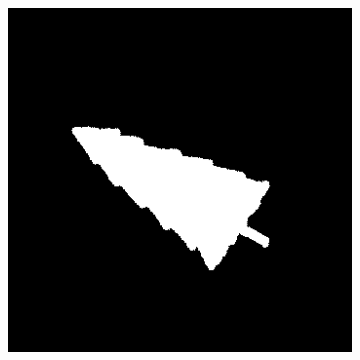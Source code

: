 \documentclass[
	article,			%
	11pt,				%
	oneside,			%
	a4paper,			%
	english,			%
	brazil,				%
	sumario=tradicional
	]{abntex2}
\begin{document}
\begin{figure}
\begin{subfigure}[b]{0.3\textwidth}
        \end{subfigure}
        ~
        \begin{subfigure}[b]{0.3\textwidth}
                \includegraphics[width=\textwidth]{imagens/ex1/image60.png}
                \caption{}
                \label{fig:rot2}


\end{subfigure}
\end{figure}
\end{document}
